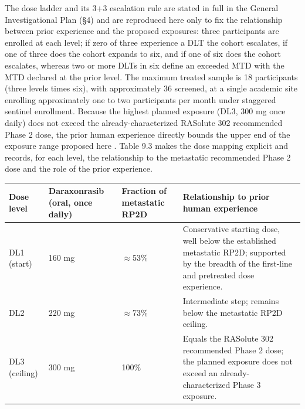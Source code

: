 The dose ladder and its 3+3 escalation rule are stated in full in the General
Investigational Plan (\S 4) and are reproduced here only to fix the relationship
between prior experience and the proposed exposures: three participants are enrolled
at each level; if zero of three experience a DLT the cohort escalates, if one of
three does the cohort expands to six, and if one of six does the cohort escalates,
whereas two or more DLTs in six define an exceeded MTD with the MTD declared at the
prior level. The maximum treated sample is 18 participants (three levels times six),
with approximately 36 screened, at a single academic site enrolling approximately
one to two participants per month under staggered sentinel enrollment. Because the
highest planned exposure (DL3, 300 mg once daily) does not exceed the
already-characterized RASolute 302 recommended Phase 2 dose, the prior human
experience directly bounds the upper end of the exposure range proposed here
\cite{daraxwhipple, phase1guidance}. Table 9.3 makes the dose mapping explicit and
records, for each level, the relationship to the metastatic recommended Phase 2
dose and the role of the prior experience.

\noindent\begin{tabularx}{\textwidth}{C{1.6cm} C{2.2cm} C{2.6cm} Y}
\toprule
\textbf{Dose level} & \textbf{Daraxonrasib (oral, once daily)} & \textbf{Fraction of metastatic RP2D} & \textbf{Relationship to prior human experience} \\
\midrule
DL1 (start) & 160 mg & $\approx$53\% & Conservative starting dose, well below the established metastatic RP2D; supported by the breadth of the first-line and pretreated dose experience. \\
DL2 & 220 mg & $\approx$73\% & Intermediate step; remains below the metastatic RP2D ceiling. \\
DL3 (ceiling) & 300 mg & 100\% & Equals the RASolute 302 recommended Phase 2 dose; the planned exposure does not exceed an already-characterized Phase 3 exposure. \\
\bottomrule
\end{tabularx}
\vspace{-0.25cm}

